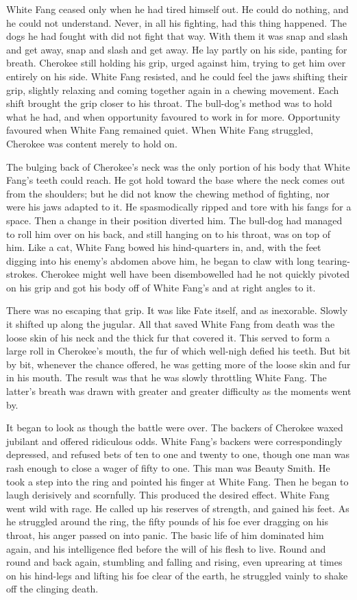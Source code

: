 \documentclass[10pt]{book}
\begin{document}
White Fang ceased only when he had tired himself out. He could do
nothing, and he could not understand. Never, in all his fighting, had
this thing happened. The dogs he had fought with did not fight that
way. With them it was snap and slash and get away, snap and slash and
get away. He lay partly on his side, panting for breath. Cherokee still
holding his grip, urged against him, trying to get him over entirely on
his side. White Fang resisted, and he could feel the jaws shifting
their grip, slightly relaxing and coming together again in a chewing
movement. Each shift brought the grip closer to his throat. The
bull-dog’s method was to hold what he had, and when opportunity
favoured to work in for more. Opportunity favoured when White Fang
remained quiet. When White Fang struggled, Cherokee was content merely
to hold on.

The bulging back of Cherokee’s neck was the only portion of his body
that White Fang’s teeth could reach. He got hold toward the base where
the neck comes out from the shoulders; but he did not know the chewing
method of fighting, nor were his jaws adapted to it. He spasmodically
ripped and tore with his fangs for a space. Then a change in their
position diverted him. The bull-dog had managed to roll him over on his
back, and still hanging on to his throat, was on top of him. Like a
cat, White Fang bowed his hind-quarters in, and, with the feet digging
into his enemy’s abdomen above him, he began to claw with long
tearing-strokes. Cherokee might well have been disembowelled had he not
quickly pivoted on his grip and got his body off of White Fang’s and at
right angles to it.

There was no escaping that grip. It was like Fate itself, and as
inexorable. Slowly it shifted up along the jugular. All that saved
White Fang from death was the loose skin of his neck and the thick fur
that covered it. This served to form a large roll in Cherokee’s mouth,
the fur of which well-nigh defied his teeth. But bit by bit, whenever
the chance offered, he was getting more of the loose skin and fur in
his mouth. The result was that he was slowly throttling White Fang. The
latter’s breath was drawn with greater and greater difficulty as the
moments went by.

It began to look as though the battle were over. The backers of
Cherokee waxed jubilant and offered ridiculous odds. White Fang’s
backers were correspondingly depressed, and refused bets of ten to one
and twenty to one, though one man was rash enough to close a wager of
fifty to one. This man was Beauty Smith. He took a step into the ring
and pointed his finger at White Fang. Then he began to laugh derisively
and scornfully. This produced the desired effect. White Fang went wild
with rage. He called up his reserves of strength, and gained his feet.
As he struggled around the ring, the fifty pounds of his foe ever
dragging on his throat, his anger passed on into panic. The basic life
of him dominated him again, and his intelligence fled before the will
of his flesh to live. Round and round and back again, stumbling and
falling and rising, even uprearing at times on his hind-legs and
lifting his foe clear of the earth, he struggled vainly to shake off
the clinging death.
\end{document}
